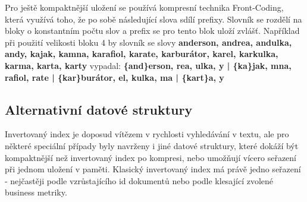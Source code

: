 \documentclass[12pt]{article}
\begin{document}
%

Pro ještě kompaktnější uložení se používá kompresní technika Front-Coding,
která využívá toho, že po sobě následující slova sdílí prefixy. Slovník se
rozdělí na bloky o konstantním počtu slov a prefix se pro tento blok uloží
zvlášť. Například při použití velikosti bloku 4 by slovník se slovy
\textbf{anderson, andrea, andulka, andy, kajak, kamna, karafiol, karate,
karburátor, karel, karkulka, karma, karta, karty} vypadal:
\textbf{\{and\}erson, rea, ulka, y | \{ka\}jak, mna, rafiol, rate | \{kar\}burátor, el, kulka, ma | \{kart\}a, y}


\subsection{Alternativní datové struktury}
Invertovaný index je doposud vítězem v rychlosti vyhledávání v textu,
ale pro některé speciální případy byly navrženy i jiné datové struktury,
které dokáží být kompaktnější než invertovaný index po kompresi, nebo
umožňují vícero seřazení při jednom uložení v paměti. Klasický
invertovaný index má právě jedno seřazení - nejčastěji podle
vzrůstajícího id dokumentů nebo podle klesající zvolené business
metriky.
\end{document}
